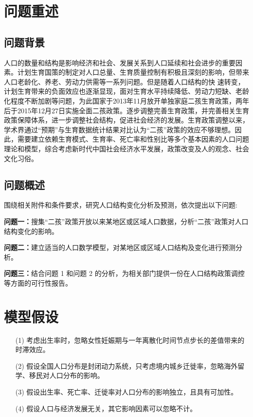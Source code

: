 \documentclass{whutmod}
\begin{document}
	

	
	\section{问题重述}	
		\subsection{问题背景}
		人口的数量和结构是影响经济和社会、发展关系到人口延续和社会进步的重要因素。计划生育国策的制定对人口总量、生育质量控制有积极且深刻的影响，但带来人口老龄化、养老、劳动力供需等一系列问题。但是随着人口结构的快 速转变，计划生育带来的负面效应也逐渐显现，面对生育水平持续降低、劳动力短缺、老龄化程度不断加剧等问题，为此国家于2013年11月放开单独家庭二孩生育政策，两年后于2015年12月27日实施全面二孩政策。逐步调整完善生育政策，并完善相关生育政策保障体系，进一步调整社会结构，促进社会经济的发展。生育政策调整以来，学术界通过“预期”与生育数据统计结果对比认为“二孩”政策的效应不够理想。因此，需要建立依赖生育模式、生育率、死亡率和性别比等多个基本因素的人口问题理论和模型，综合考虑新时代中国社会经济水平发展，政策改变及人的观念、社会文化习俗。

	
		\subsection{问题概述}
		    围绕相关附件和条件要求，研究人口结构变化分析及预测，依次提出以下问题:
				 
			
			\textbf{问题一：}搜集“二孩”政策开放以来某地区或区域人口数据，分析“二孩”政策对人口结构变化的影响。
			
			\textbf{问题二：}建立适当的人口数学模型，对某地区或区域人口结构及变化进行预测分析。
			
			\textbf{问题三：}结合问题 1 和问题 2 的分析，为相关部门提供一份在人口结构政策调控等方面的可行性报告。

	
	\section{模型假设}
		\begin{itemize}                                             
		\item [(1)]考虑出生率时，忽略女性妊娠期与一年离散化时间节点步长的差值带来的时滞效应。
		\item [(2)]假设全国人口分布是封闭动力系统，只考虑境内城乡迁徙率，忽略海外留学、移民对人口分布的影响。
		\item [(3)]假设出生率、死亡率、迁徙率对人口分布的影响独立，且具有可加性。
		\item [(4)]假设人口与经济发展无关，其它影响因素可以忽略不计。 
		\end{itemize}
\end{document}
